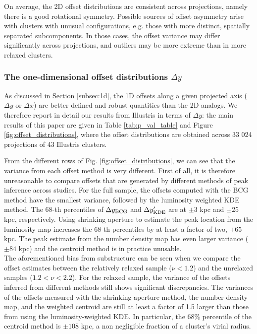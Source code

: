 \documentclass[usenatbib]{mn2e}
\begin{document}
{On average, the 2D offset distributions are consistent across projections, namely there is a good rotational symmetry.
Possible sources of offset asymmetry arise with clusters with unusual configurations, e.g. those with more distinct, spatially separated subcomponents.
In those cases, the offset variance may differ significantly across projections, and outliers may be more extreme than in more relaxed clusters.


\subsubsection{The one-dimensional offset distributions $\Delta y$}

As discussed in Section \ref{subsec:1d}, the 1D offsets along a given projected axis ($\Delta y$ or  $\Delta x$) are better defined and robust quantities than the 2D analogs. We therefore report in detail our results from Illustris in terms of $\Delta y$: the main results of this paper are given in Table \ref{tab:p_val_table} and Figure \ref{fig:offset_distributions}, where the offset distributions are obtained across 33 024 projections of 43 Illustris clusters.

From the different rows of Fig. \ref{fig:offset_distributions}, we can see 
that the variance from each offset method is very different. First of all, it is therefore unreasonable to compare offsets that are generated 
by different methods of peak inference across studies.
For the full sample, the offsets computed with the BCG method have the smallest variance, followed by the luminosity weighted KDE method. The 68-th percentiles of $\Delta y_{\rm BCG}$ and $\Delta y_{\rm KDE}'$ are at $\pm 3$ kpc and $\pm 25$ kpc, respectively. Using shrinking aperture to estimate
the peak location from the luminosity map increases the 68-th percentiles by at least a factor of two, $\pm 65$ kpc.
The peak estimate from the number density map has even larger variance ($\pm 84$ kpc) and the centroid method is in practice unusable.\\

The aforementioned bias from substructure can be seen when we compare the
offset estimates between the relatively relaxed sample  ($\nu < 1.2$) and the
unrelaxed samples ($1.2 < \nu < 2.2$). 
For the relaxed sample, the variance of the offsets inferred from different
methods still shows significant discrepancies. 
The variances of the offsets measured with the shrinking aperture method, 
the number density map, and the weighted centroid are still at least a factor of 1.5
larger than those from using the luminosity-weighted KDE. 
In particular, the 68\% percentile of the centroid method is $\pm 108$ kpc, a non negligible fraction of a cluster's virial radius. \\

}
\end{document}
